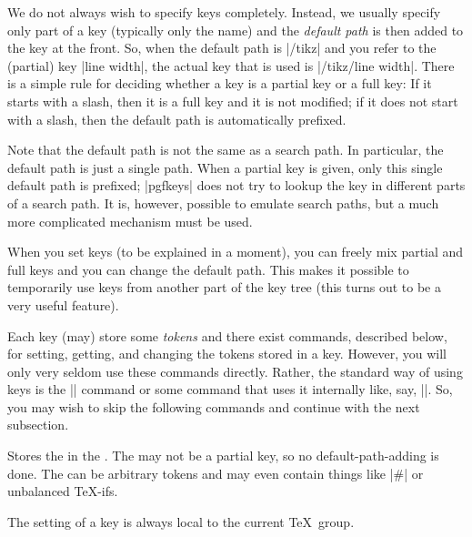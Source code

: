 We do not always wish to specify keys completely. Instead, we usually
specify only part of a key (typically only the name) and the
\emph{default path} is then added to the key at the front. So, when
the default path is |/tikz| and you 
refer to the (partial) key |line width|, the actual key that is used
is |/tikz/line width|. There is a simple rule for deciding whether a
key is a partial key or a full key: If it starts with a slash, then it
is a full key and it is not modified; if it does not start with
a slash, then the default path is automatically prefixed.

Note that the default path is not the same as a search path. In
particular, the default path is just a single path. When a partial key
is given, only this single default path is prefixed; |pgfkeys| does
not try to lookup the key in different parts of a search path. It is,
however, possible to emulate search paths, but a much more
complicated mechanism must be used.

When you set keys (to be explained in a moment), you can freely mix
partial and full keys and you can change the default path. This makes
it possible to temporarily use keys from another part of the key tree
(this turns out to be a very useful feature).

Each key (may) store some \emph{tokens} and there exist commands,
described below, for setting, getting, and changing the tokens stored
in a key. However, you will only very seldom use these commands
directly. Rather, the standard way of using keys is the |\pgfkeys|
command or some command that uses it internally like, say,
|\tikzset|. So, you may wish to skip the following commands and
continue with the next subsection.

\begin{command}{\pgfkeyssetvalue{}}
  Stores the  in the . The 
  may not be a partial key, so no default-path-adding is done. The
   can be arbitrary tokens and may even contain things
  like |#| or unbalanced \TeX-ifs.
\begin{codeexample}[]
\end{codeexample}

  The setting of a key is always local to the current \TeX\ group.
\end{command}


